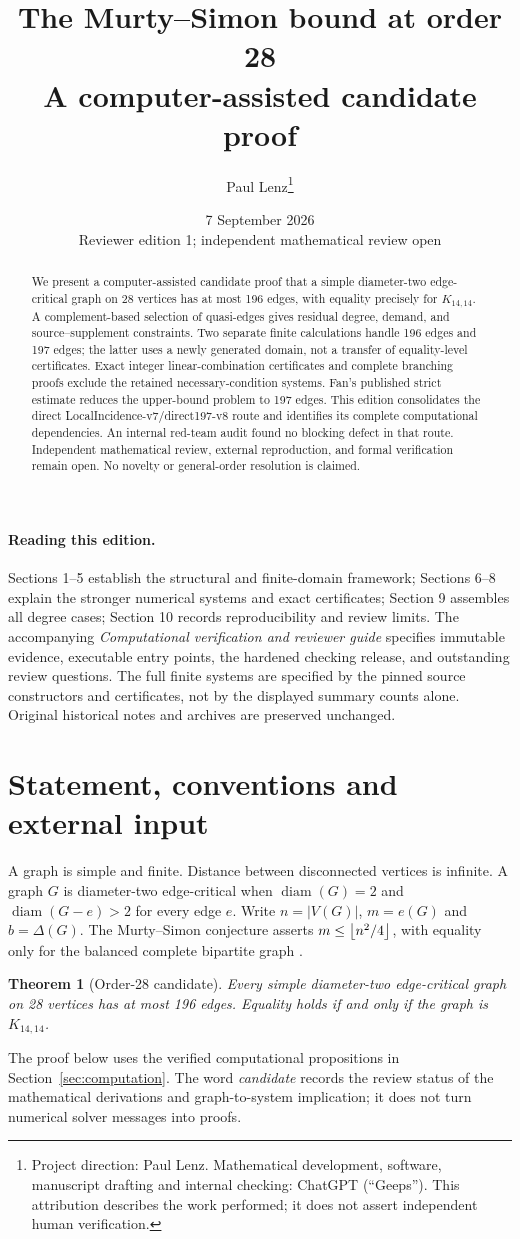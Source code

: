 \documentclass[11pt,a4paper]{article}
\title{The Murty--Simon bound at order 28\\\large A computer-assisted candidate proof}
\author{Paul Lenz\thanks{Project direction: Paul Lenz. Mathematical development, software, manuscript drafting and internal checking: ChatGPT (``Geeps''). This attribution describes the work performed; it does not assert independent human verification.}}
\date{7 September 2026\\\small Reviewer edition 1; independent mathematical review open}
\newtheorem{theorem}{Theorem}[section]\newtheorem{lemma}[theorem]{Lemma}\newtheorem{proposition}[theorem]{Proposition}\newtheorem{corollary}[theorem]{Corollary}\theoremstyle{definition}\newtheorem{definition}[theorem]{Definition}
\DeclareMathOperator{\diam}{diam}
\begin{document}
\maketitle
\begin{abstract}
We present a computer-assisted candidate proof that a simple diameter-two edge-critical graph on 28 vertices has at most 196 edges, with equality precisely for $K_{14,14}$. A complement-based selection of quasi-edges gives residual degree, demand, and source--supplement constraints. Two separate finite calculations handle 196 edges and 197 edges; the latter uses a newly generated domain, not a transfer of equality-level certificates. Exact integer linear-combination certificates and complete branching proofs exclude the retained necessary-condition systems. Fan's published strict estimate reduces the upper-bound problem to 197 edges. This edition consolidates the direct LocalIncidence-v7/direct197-v8 route and identifies its complete computational dependencies. An internal red-team audit found no blocking defect in that route. Independent mathematical review, external reproduction, and formal verification remain open. No novelty or general-order resolution is claimed.
\end{abstract}
\paragraph{Reading this edition.} Sections 1--5 establish the structural and finite-domain framework; Sections 6--8 explain the stronger numerical systems and exact certificates; Section 9 assembles all degree cases; Section 10 records reproducibility and review limits. The accompanying \emph{Computational verification and reviewer guide} specifies immutable evidence, executable entry points, the hardened checking release, and outstanding review questions. The full finite systems are specified by the pinned source constructors and certificates, not by the displayed summary counts alone. Original historical notes and archives are preserved unchanged.
\bigskip
\section{Statement, conventions and external input}
A graph is simple and finite. Distance between disconnected vertices is infinite. A graph $G$ is diameter-two edge-critical when $\diam(G)=2$ and $\diam(G-e)>2$ for every edge $e$. Write $n=|V(G)|$, $m=e(G)$ and $b=\Delta(G)$. The Murty--Simon conjecture asserts $m\le\left\lfloor n^2/4\right\rfloor$, with equality only for the balanced complete bipartite graph \cite{wang,fan}.
\begin{theorem}[Order-28 candidate]\label{thm:main}
Every simple diameter-two edge-critical graph on 28 vertices has at most 196 edges. Equality holds if and only if the graph is $K_{14,14}$.
\end{theorem}
The proof below uses the verified computational propositions in Section~\ref{sec:computation}. The word \emph{candidate} records the review status of the mathematical derivations and graph-to-system implication; it does not turn numerical solver messages into proofs.
\end{document}

